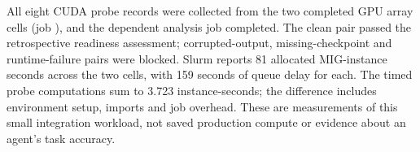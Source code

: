 All eight CUDA probe records were collected from the two completed GPU array cells (job ), and the dependent analysis job  completed. The clean pair passed the retrospective readiness assessment; corrupted-output, missing-checkpoint and runtime-failure pairs were blocked. Slurm reports 81 allocated MIG-instance seconds across the two cells, with 159 seconds of queue delay for each. The timed probe computations sum to 3.723 instance-seconds; the difference includes environment setup, imports and job overhead. These are measurements of this small integration workload, not saved production compute or evidence about an agent's task accuracy.
